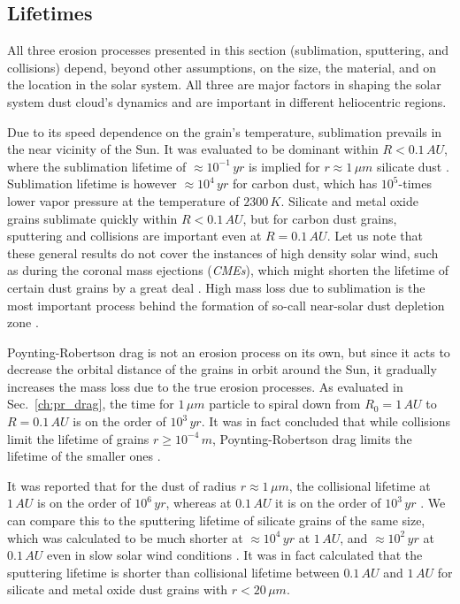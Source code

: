 \subsection{Lifetimes}

All three erosion processes presented in this section (sublimation, sputtering, and collisions) depend, beyond other assumptions, on the size, the material, and on the location in the solar system. All three are major factors in shaping the solar system dust cloud's dynamics and are important in different heliocentric regions. 

Due to its speed dependence on the grain's temperature, sublimation prevails in the near vicinity of the Sun. It was evaluated to be dominant within $R < 0.1 \, \si{AU}$, where the sublimation lifetime of $\approx 10^{-1} \, \si{yr}$ is implied for $r \approx 1 \, \si{\mu m}$ silicate dust \citep{baumann2020dust}. Sublimation lifetime is however $\approx 10^{4} \, \si{yr}$ for carbon dust, which has $10^5$-times lower vapor pressure at the temperature of $2300\, \si{K}$. Silicate and metal oxide grains sublimate quickly within $R<0.1\, \si{AU}$, but for carbon dust grains, sputtering and collisions are important even at $R = 0.1 \, \si{AU}$. Let us note that these general results do not cover the instances of high density solar wind, such as during the coronal mass ejections (\textit{CMEs}), which might shorten the lifetime of certain dust grains by a great deal \citep{baumann2020dust}. High mass loss due to sublimation is the most important process behind the formation of so-call near-solar dust depletion zone \citep{russell1929meteoric}. 

Poynting-Robertson drag is not an erosion process on its own, but since it acts to decrease the orbital distance of the grains in orbit around the Sun, it gradually increases the mass loss due to the true erosion processes. As evaluated in Sec.~\ref{ch:pr_drag}, the time for $1 \, \si{\mu m}$ particle to spiral down from $R_0 = 1 \, \si{AU}$ to $R = 0.1 \, \si{AU}$ is on the order of $10^3 \, \si{yr}$. It was in fact concluded that while collisions limit the lifetime of grains $r \geq 10^{-4} \, \si{m}$, Poynting-Robertson drag limits the lifetime of the smaller ones \citep{grun1985collisional}. 

It was reported that for the dust of radius $r \approx 1 \, \si{\mu m}$, the collisional lifetime at $1\,\si{AU}$ is on the order of $10^6 \, \si{yr}$, whereas at $0.1\,\si{AU}$ it is on the order of $10^3 \, \si{yr}$ \citep{grun1985collisional}. We can compare this to the sputtering lifetime of silicate grains of the same size, which was calculated to be much shorter at  $\approx 10^4 \, \si{yr}$ at $1\,\si{AU}$, and $\approx 10^2 \, \si{yr}$ at $0.1\,\si{AU}$ even in slow solar wind conditions \citep{klepper2021influence}. It was in fact calculated \citep{klepper2021influence} that the sputtering lifetime is shorter than collisional lifetime between $0.1 \, \si{AU}$ and $1 \, \si{AU}$ for silicate and metal oxide dust grains with $r<20 \, \si{\mu m}$.

